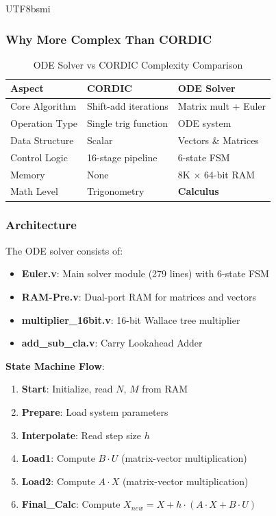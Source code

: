 \documentclass[journal,twoside]{IEEEtran}
\begin{document}
\begin{CJK}{UTF8}{bsmi}
\subsubsection{Why More Complex Than CORDIC}
\begin{table}[!t]
\centering
\caption{ODE Solver vs CORDIC Complexity Comparison}
\label{tab:ode_vs_cordic}
\footnotesize
\begin{tabular}{@{}lll@{}}
\toprule
\textbf{Aspect} & \textbf{CORDIC} & \textbf{ODE Solver} \\
\midrule
Core Algorithm & Shift-add iterations & Matrix mult + Euler \\
Operation Type & Single trig function & ODE system \\
Data Structure & Scalar & Vectors \& Matrices \\
Control Logic & 16-stage pipeline & 6-state FSM \\
Memory & None & 8K $\times$ 64-bit RAM \\
Math Level & Trigonometry & \textbf{Calculus} \\
\bottomrule
\end{tabular}
\end{table}

\subsubsection{Architecture}
The ODE solver consists of:
\begin{itemize}
    \item \textbf{Euler.v}: Main solver module (279 lines) with 6-state FSM
    \item \textbf{RAM-Pre.v}: Dual-port RAM for matrices and vectors
    \item \textbf{multiplier\_16bit.v}: 16-bit Wallace tree multiplier
    \item \textbf{add\_sub\_cla.v}: Carry Lookahead Adder
\end{itemize}

\textbf{State Machine Flow}:
\begin{enumerate}
    \item \textbf{Start}: Initialize, read $N$, $M$ from RAM
    \item \textbf{Prepare}: Load system parameters
    \item \textbf{Interpolate}: Read step size $h$
    \item \textbf{Load1}: Compute $B \cdot U$ (matrix-vector multiplication)
    \item \textbf{Load2}: Compute $A \cdot X$ (matrix-vector multiplication)
    \item \textbf{Final\_Calc}: Compute $X_{new} = X + h \cdot (A \cdot X + B \cdot U)$
\end{enumerate}


\end{CJK}
\end{document}
